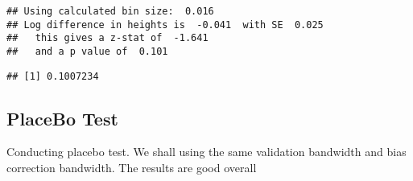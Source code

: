\documentclass[
]{article}
\newenvironment{Shaded}{\begin{snugshade}}{\end{snugshade}}
\newcommand{\AttributeTok}[1]{\textcolor[rgb]{0.77,0.63,0.00}{#1}}
\newcommand{\ConstantTok}[1]{\textcolor[rgb]{0.00,0.00,0.00}{#1}}
\newcommand{\FloatTok}[1]{\textcolor[rgb]{0.00,0.00,0.81}{#1}}
\newcommand{\FunctionTok}[1]{\textcolor[rgb]{0.00,0.00,0.00}{#1}}
\newcommand{\NormalTok}[1]{#1}
\newcommand{\SpecialCharTok}[1]{\textcolor[rgb]{0.00,0.00,0.00}{#1}}
\begin{document}
\begin{Shaded}
\end{Shaded}

\begin{verbatim}
## Using calculated bin size:  0.016 
## Log difference in heights is  -0.041  with SE  0.025 
##   this gives a z-stat of  -1.641 
##   and a p value of  0.101
\end{verbatim}

\begin{verbatim}
## [1] 0.1007234
\end{verbatim}

\hypertarget{placebo-test}{%
\subsection{PlaceBo Test}\label{placebo-test}}

Conducting placebo test. We shall using the same validation bandwidth
and bias correction bandwidth. The results are good overall
\end{document}
